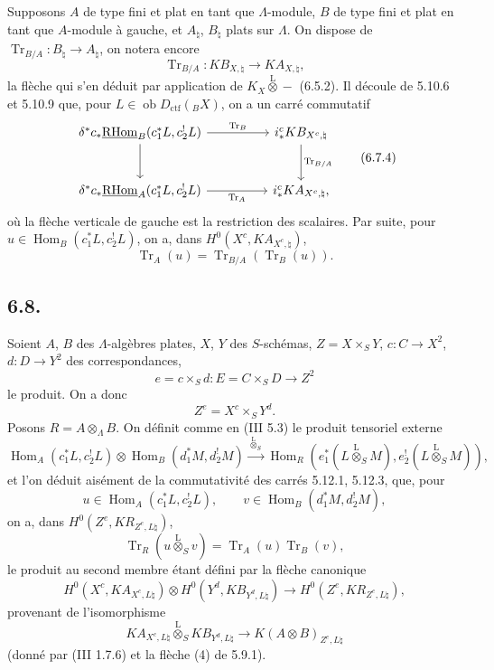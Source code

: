 \documentclass[11pt]{article}
\DeclareMathOperator{\Hom}{Hom}
\newcommand{\R}{\mathrm{R}}\newcommand{\RHomCore}{\mathrm{RHom}}
\providecommand{\RHom}{\RHomCore}
\providecommand{\uRHom}{\underline{\RHom}}
\providecommand{\Tr}{\operatorname{Tr}}
\providecommand{\Tr}{\operatorname{Tr}}
\providecommand{\lten}{\overset{\mathrm L}{\otimes}}
\providecommand{\Ob}{\operatorname{ob}}
\providecommand{\Tr}{\operatorname{Tr}}
\providecommand{\RHom}{\RHomCore}
\providecommand{\Hom}{\operatorname{Hom}}
\providecommand{\lten}{\overset{\mathrm L}{\otimes}}
\providecommand{\RHom}{\R\mathcal{H}om}
\providecommand{\lten}{\overset{\mathrm L}{\otimes}}
\providecommand{\Ob}{\operatorname{ob}}
\providecommand{\R}{\mathrm R}
\providecommand{\Tr}{\operatorname{Tr}}
\providecommand{\lten}{\overset{\mathrm L}{\otimes}}
\providecommand{\lten}{\overset{\mathrm L}{\otimes}}
\providecommand{\Ob}{\operatorname{Ob}}
\providecommand{\lten}{\overset{\mathrm L}{\otimes}}
\providecommand{\RHom}{\RHomCore}
\providecommand{\Hom}{\operatorname{Hom}}
\providecommand{\Tr}{\operatorname{Tr}}
\providecommand{\Ob}{\operatorname{ob}}
\providecommand{\Ob}{\operatorname{Ob}}
\providecommand{\lten}{\overset{\mathrm L}{\otimes}}
\begin{document}
Supposons $A$ de type fini et plat en tant que $\Lambda$-module, $B$ de type fini et plat en tant que $A$-module à gauche, et $A_{\natural}$, $B_{\natural}$ plats sur $\Lambda$. On dispose de $\Tr_{B/A}:B_{\natural}\to A_{\natural}$, on notera encore
\begin{equation}
\Tr_{B/A}:KB_{X,\natural}\longrightarrow KA_{X,\natural},
\tag{6.7.3}
\end{equation}
la flèche qui s'en déduit par application de $K_X\lten -$ (6.5.2). Il découle de 5.10.6 et 5.10.9 que, pour $L\in\Ob D_{\mathrm{ctf}}({}_BX)$, on a un carré commutatif
\begin{equation}
\begin{tikzcd}[column sep=huge,row sep=large]
\delta^*c_*\uRHom_B(c_1^*L,c_2^!L) \arrow[r,"\Tr_B"] \arrow[d]
& i_*^cKB_{X^c,\natural} \arrow[d,"\Tr_{B/A}"]\\
\delta^*c_*\uRHom_A(c_1^*L,c_2^!L) \arrow[r,"\Tr_A"']
& i_*^cKA_{X^c,\natural},
\end{tikzcd}
\tag{6.7.4}
\end{equation}
où la flèche verticale de gauche est la restriction des scalaires. Par suite, pour $u\in\Hom_B(c_1^*L,c_2^!L)$, on a, dans $H^0(X^c,KA_{X^c,\natural})$,
\begin{equation}
\Tr_A(u)=\Tr_{B/A}(\Tr_B(u)).
\tag{6.7.5}
\end{equation}

\subsection*{6.8.}
Soient $A$, $B$ des $\Lambda$-algèbres plates, $X$, $Y$ des $S$-schémas, $Z=X\times_SY$, $c:C\to X^2$, $d:D\to Y^2$ des correspondances,
\[
e=c\times_Sd:E=C\times_SD\longrightarrow Z^2
\]
le produit. On a donc
\[
Z^e=X^c\times_SY^d.
\]
Posons $R=A\otimes_{\Lambda}B$. On définit comme en (III 5.3) le produit tensoriel externe
\begin{equation}
\Hom_A(c_1^*L,c_2^!L)\otimes \Hom_B(d_1^*M,d_2^!M)
\xrightarrow{\ \lten_S\ }
\Hom_R(e_1^*(L\lten_SM),e_2^!(L\lten_SM)),
\tag{6.8.1}
\end{equation}
et l'on déduit aisément de la commutativité des carrés 5.12.1, 5.12.3, que, pour
\[
u\in\Hom_A(c_1^*L,c_2^!L),\qquad v\in\Hom_B(d_1^*M,d_2^!M),
\]
on a, dans $H^0(Z^e,KR_{Z^e,L\natural})$,
\begin{equation}
\Tr_R(u\lten_Sv)=\Tr_A(u)\Tr_B(v),
\tag{6.8.2}
\end{equation}
le produit au second membre étant défini par la flèche canonique
\begin{equation}
H^0(X^c,KA_{X^c,L\natural})\otimes
H^0(Y^d,KB_{Y^d,L\natural})
\longrightarrow
H^0(Z^e,KR_{Z^e,L\natural}),
\tag{6.8.3}
\end{equation}
provenant de l'isomorphisme
\[
KA_{X^c,L\natural}\lten_S KB_{Y^d,L\natural}\longrightarrow K(A\otimes B)_{Z^e,L\natural}
\]
(donné par (III 1.7.6) et la flèche (4) de 5.9.1).
\end{document}
